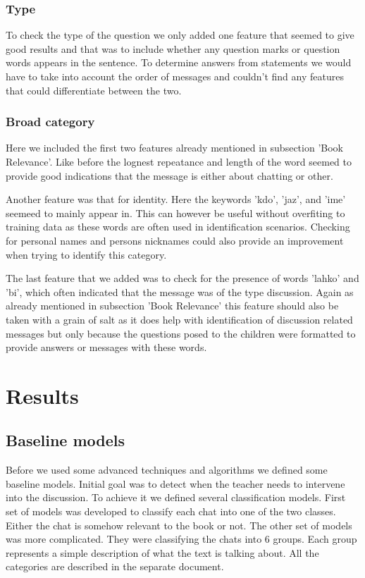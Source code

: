 \documentclass[11pt,a4paper]{article}
\begin{document}
\subsubsection{Type}

To check the type of the question we only added one feature that seemed to give good results and that was to include whether any question marks or question words appears in the sentence.
To determine answers from statements we would have to take into account the order of messages and couldn't find any features that could differentiate between the two.

\subsubsection{Broad category}

Here we included the first two features already mentioned in subsection 'Book Relevance'.
Like before the lognest repeatance and length of the word seemed to provide good indications that the message is either about chatting or other.

Another feature was that for identity.
Here the keywords 'kdo', 'jaz', and 'ime' seemeed to mainly appear in.
This can however be useful without overfiting to training data as these words are often used in identification scenarios.
Checking for personal names and persons nicknames could also provide an improvement when trying to identify this category.

The last feature that we added was to check for the presence of words 'lahko' and 'bi', which often indicated that the message was of the type discussion.
Again as already mentioned in subsection 'Book Relevance' this feature should also be taken with a grain of salt as it does help with identification of discussion related messages but only because the questions posed to the children were formatted to provide answers or messages with these words. 

\section{Results} 

\subsection{Baseline models}
Before we used some advanced techniques and algorithms we defined some baseline models.
Initial goal was to detect when the teacher needs to intervene into the discussion.
To achieve it we defined several classification models.
First set of models was developed to classify each chat into one of the two classes.
Either the chat is somehow relevant to the book or not.
The other set of models was more complicated.
They were classifying the chats into 6 groups.
Each group represents a simple description of what the text is talking about.
All the categories are described in the separate document. %
\end{document}
